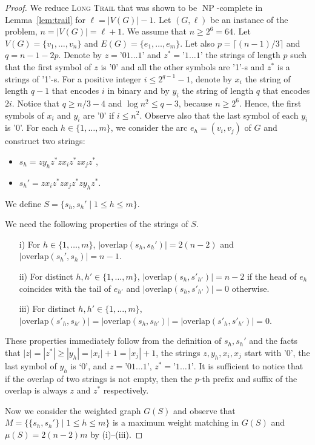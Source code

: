 \documentclass[11pt]{article}
\newcommand{\overlap}{\textrm{overlap}}
\DeclareMathOperator{\operatorClassNP}{NP}
\newcommand{\classNP}{\ensuremath{\operatorClassNP}}
\begin{document}
\begin{proof}
We reduce \textsc{Long Trail} that was shown to be \classNP-complete in Lemma~\ref{lem:trail} for $\ell=|V(G)|-1$. Let $(G,\ell)$ be an instance of the problem, $n=|V(G)|=\ell+1$. We assume that $n\geq 2^6=64$. Let $V(G)=\{v_1,\ldots,v_n\}$ and $E(G)=\{e_1,\ldots,e_m\}$.
Let also $p=\lceil (n-1)/3\rceil$ and $q=n-1-2p$. Denote by $z=\text{'}01\ldots1\text{'}$ and $z^*=\text{'}1\ldots1\text{'}$ the strings of length $p$ such that the first symbol of $z$ is '0' and all the other symbols are '1'-s and $z^*$ is a strings of '1'-s.
For a positive integer $i\leq 2^{q-1}-1$, denote by $x_i$ the string of length $q-1$ that encodes $i$ in binary and by $y_i$ the string of length $q$ that encodes $2i$. 
Notice that $q\geq n/3-4$ and $\log n^2\leq q-3$, because $n\geq 2^6$. Hence, the first symbols of $x_i$ and $y_i$ are '0' if $i\leq n^2$. Observe also that the last symbol of each $y_i$ is '0'. 
For each $h\in\{1,\ldots,m\}$, we consider the arc $e_h=(v_i,v_j)$ of $G$ and construct two strings:
\begin{itemize}
\item $s_h=zy_hz^*zx_iz^*zx_jz^*$, 
\item $s_h'= zx_iz^*zx_jz^*zy_hz^*$.
\end{itemize}
We define $S=\{s_h,s_h'\mid 1\leq h\leq m\}$.

We need the following properties of the strings of $S$.
\begin{itemize}
 \item[i)] For $h\in\{1,\ldots,m\}$, $|\overlap(s_h,s_h')|=2(n-2)$ and $|\overlap(s_h',s_h)|=n-1$.
 \item[ii)] For distinct $h,h'\in\{1,\ldots,m\}$, $|\overlap(s_h,s'_{h'})|=n-2$ if the head of $e_h$ coincides with the tail of $e_{h'}$ and  $|\overlap(s_h,s'_{h'})|=0$ otherwise.
 \item[iii)] For distinct $h,h'\in\{1,\ldots,m\}$, $|\overlap(s'_h,s_{h'})|=|\overlap(s_h,s_{h'})|=|\overlap(s'_h,s'_{h'})|=0$.
\end{itemize}
These properties immediately follow from the definition of $s_h,s_h'$ and the facts that $|z|=|z^*|\geq |y_h| =|x_i|+1=|x_j|+1$, the strings $z,y_h,x_i,x_j$ start with '0', the last symbol of $y_h$ is \lq{}0',  and $z=\text{'}01\ldots1\text{'}$, $z^*=\text{'}1\ldots1\text{'}$. It is sufficient to notice that if the overlap of two strings is not empty, then the $p$-th prefix and suffix of the overlap is always $z$ and $z^*$ respectively.

Now we consider the weighted graph $G(S)$ and observe that $M=\{\{s_h,s_h'\}\mid 1\leq h\leq m\}$ is a maximum weight matching in $G(S)$ and $\mu(S)=2(n-2)m$ by (i)--(iii).


\end{proof}
\end{document}
